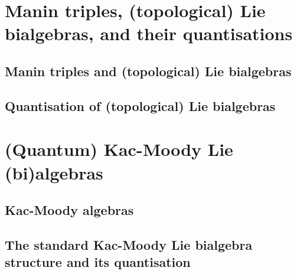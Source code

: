     \begin{appendices}
        \section{Manin triples, (topological) Lie bialgebras, and their quantisations} 
            \subsection{Manin triples and (topological) Lie bialgebras} \label{subsection: manin_triples}
                

                

            \subsection{Quantisation of (topological) Lie bialgebras}
                
    
        \section{(Quantum) Kac-Moody Lie (bi)algebras}
            \subsection{Kac-Moody algebras} \label{subsection: setup_kac_moody_algebras}
                

            \subsection{The standard Kac-Moody Lie bialgebra structure and its quantisation} \label{subsection: setup_standard_kac_moody_lie_bialgebras}
                

                
    \end{appendices}
	
    \printbibliography

